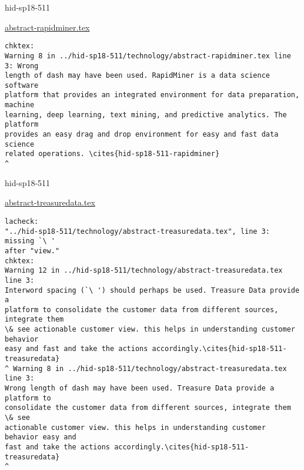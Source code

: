 \begin{IU}

hid-sp18-511

\href{https://github.com/cloudmesh-community/hid-sp18-511/blob/master//technology/abstract-rapidminer.tex}{abstract-rapidminer.tex}

\begin{tiny}
\begin{verbatim}
chktex:
Warning 8 in ../hid-sp18-511/technology/abstract-rapidminer.tex line 3: Wrong
length of dash may have been used. RapidMiner is a data science software
platform that provides an integrated environment for data preparation, machine
learning, deep learning, text mining, and predictive analytics. The platform
provides an easy drag and drop environment for easy and fast data science
related operations. \cites{hid-sp18-511-rapidminer}
^
\end{verbatim}
\end{tiny}
\end{IU}



\begin{IU}

hid-sp18-511

\href{https://github.com/cloudmesh-community/hid-sp18-511/blob/master//technology/abstract-treasuredata.tex}{abstract-treasuredata.tex}

\begin{tiny}
\begin{verbatim}
lacheck:
"../hid-sp18-511/technology/abstract-treasuredata.tex", line 3: missing `\ '
after "view."
chktex:
Warning 12 in ../hid-sp18-511/technology/abstract-treasuredata.tex line 3:
Interword spacing (`\ ') should perhaps be used. Treasure Data provide a
platform to consolidate the customer data from different sources, integrate them
\& see actionable customer view. this helps in understanding customer behavior
easy and fast and take the actions accordingly.\cites{hid-sp18-511-treasuredata}
^ Warning 8 in ../hid-sp18-511/technology/abstract-treasuredata.tex line 3:
Wrong length of dash may have been used. Treasure Data provide a platform to
consolidate the customer data from different sources, integrate them \& see
actionable customer view. this helps in understanding customer behavior easy and
fast and take the actions accordingly.\cites{hid-sp18-511-treasuredata}
^
\end{verbatim}
\end{tiny}
\end{IU}


